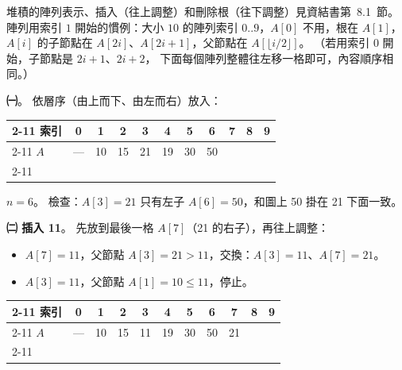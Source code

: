 \begin{pastsoln}
堆積的陣列表示、插入（往上調整）和刪除根（往下調整）見資結書第~8.1~節。 陣列用索引 $1$ 開始的慣例：大小 $10$ 的陣列索引 $0..9$，$A[0]$
不用，根在 $A[1]$，$A[i]$ 的子節點在 $A[2i]$、$A[2i+1]$，父節點在 $A[\lfloor i/2 \rfloor]$。 （若用索引 $0$ 開始，子節點是 $2i+1$、$2i+2$，
下面每個陣列整體往左移一格即可，內容順序相同。）

\textbf{㈠}。 依層序（由上而下、由左而右）放入：
\begin{center}
\small
\begin{tabular}{l|*{10}{c|}}
\cline{2-11}
索引 & 0 & 1 & 2 & 3 & 4 & 5 & 6 & 7 & 8 & 9 \\ \cline{2-11}
$A$ & — & 10 & 15 & 21 & 19 & 30 & 50 & & & \\ \cline{2-11}
\end{tabular}
\end{center}
$n = 6$。 檢查：$A[3] = 21$ 只有左子 $A[6] = 50$，和圖上 50 掛在 21 下面一致。

\textbf{㈡ 插入 11}。 先放到最後一格 $A[7]$（21 的右子），再往上調整：
\begin{itemize}
\item $A[7] = 11$，父節點 $A[3] = 21 > 11$，交換：$A[3] = 11$、$A[7] = 21$。
\item $A[3] = 11$，父節點 $A[1] = 10 \le 11$，停止。
\end{itemize}
\begin{center}
\qquad
\begin{tabular}[b]{l|*{10}{c|}}
\cline{2-11}
索引 & 0 & 1 & 2 & 3 & 4 & 5 & 6 & 7 & 8 & 9 \\ \cline{2-11}
$A$ & — & 10 & 15 & 11 & 19 & 30 & 50 & 21 & & \\ \cline{2-11}
\end{tabular}
\end{center}


\end{pastsoln}
